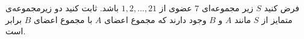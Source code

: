 \EXERCISE
فرض کنيد 
$S$
 زير مجموعه‌ای 
$7$
  عضوی از 
${1, 2, ..., 21}$
  باشد. ثابت کنيد دو زيرمجموعه‌ی متمايز از 
$S$
مانند 
$A$
 و 
$B$
  وجود دارند که مجموع اعضای 
$A$
   با مجموع اعضای 
$B$
    برابر است.